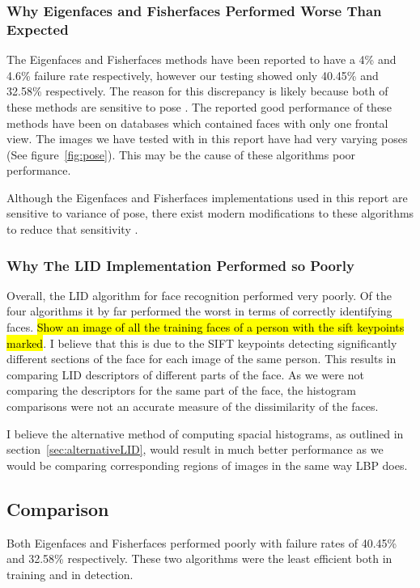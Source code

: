 \documentclass{article}
\begin{document}
\subsubsection{Why Eigenfaces and Fisherfaces Performed Worse Than Expected}
The Eigenfaces and Fisherfaces methods have been reported to have a 4\%\cite{turk1991eigenfaces} and 4.6\%\cite{belhumeur1997eigenfaces} failure rate respectively, however our testing showed only 40.45\% and 32.58\% respectively. The reason for this discrepancy is likely because both of these methods are sensitive to pose \cite{turk1991eigenfaces}\cite{belhumeur1997eigenfaces}. The reported good performance of these methods have been on databases which contained faces with only one frontal view. The images we have tested with in this report have had very varying poses (See figure~\ref{fig:pose}). This may be the cause of these algorithms poor performance.

Although the Eigenfaces and Fisherfaces implementations used in this report are sensitive to variance of pose, there exist modern modifications to these algorithms to reduce that sensitivity \cite{jaiswal2012local}.

\subsubsection{Why The LID Implementation Performed so Poorly}
Overall, the LID algorithm for face recognition performed very poorly. Of the four algorithms it by far performed the worst in terms of correctly identifying faces. \hl{Show an image of all the training faces of a person with the sift keypoints marked}. I believe that this is due to the SIFT keypoints detecting significantly different sections of the face for each image of the same person. This results in comparing LID descriptors of different parts of the face. As we were not comparing the descriptors for the same part of the face, the histogram comparisons were not an accurate measure of the dissimilarity of the faces.

I believe the alternative method of computing spacial histograms, as outlined in section~\ref{sec:alternativeLID}, would result in much better performance as we would be comparing corresponding regions of images in the same way LBP does.

\subsection{Comparison}
Both Eigenfaces and Fisherfaces performed poorly with failure rates of 40.45\% and 32.58\% respectively. These two algorithms were the least efficient both in training and in detection.
\end{document}
